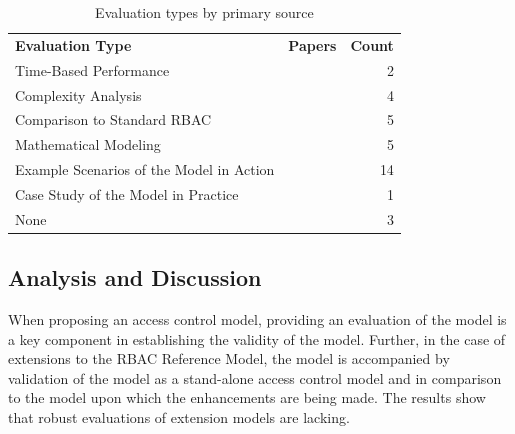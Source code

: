 \begin{table}
\centering
\caption{Evaluation types by primary source}
\vspace{0.1 in}
\begin{tabular*}{.9\linewidth}{| p{.45\linewidth} | p{.3\linewidth} | r | }
\cline{1-3}

\textbf{Evaluation Type} & \textbf{Papers} & \textbf{Count} \\ \cline{1-3}
Time-Based Performance
&
\cite{ni2010privacy}
\cite{aich09:role}
&
2 \\ \cline{1-3}
Complexity Analysis
&
\cite{bao08:role}
\cite{zhang06:collaborative}
\cite{chen08:spatio-temporal}
\cite{aich07:STARBAC}
&
4 \\ \cline{1-3}
Comparison to Standard RBAC
& 
\cite{bao08:role}
\cite{zou2009crbac}
\cite{zhang06:collaborative}
\cite{zhao2008flexible}
\cite{ray07:spatio}
&
5 \\ \cline{1-3}
Mathematical Modeling
& 
\cite{damiani2007geo}
\cite{hansen2003spatial}
\cite{aich07:STARBAC}
\cite{chen08:spatio-temporal}
\cite{joshi05:generalized}
&
5 \\ \cline{1-3}
Example Scenarios of the Model in Action
& 
\cite{alam06:constraint}
\cite{tzelepi01:flexible}
\cite{cholewka00:acontext-sensitive}
\cite{huang06:pervasive}
\cite{bao08:role}
\cite{jian2008extended}
\cite{yamazaki04:designing}
\cite{zou2009crbac}
\cite{ray07:spatio}
\cite{samuel07:spatio-temporal}
\cite{joshi05:generalized}
\cite{yao2008task}
\cite{zhou2007team}
\cite{oh2003task}
&
14 \\ \cline{1-3}
Case Study of the Model in Practice
&
\cite{motta03:contextual}
&
1 \\ \cline{1-3}
None
&
\cite{masoumzadeh2008purbac}
\cite{chandran05:llt}
\cite{ray2006lrbac}
&
3 \\ \cline{1-3}

\end{tabular*}
\label{tab:evaluations}
\end{table}

\subsection{Analysis and Discussion}

  
When proposing an access control model, providing an evaluation of the model is a key component in establishing the validity of the model. 
Further, in the case of extensions to the RBAC Reference Model, the model is accompanied by validation of the model as a stand-alone
access control model and in comparison to the model upon which the enhancements are being made. The results show that robust evaluations of
extension models are lacking. 

